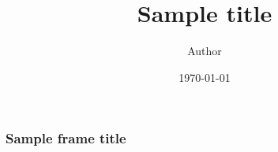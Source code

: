 \documentclass{beamer}
\title{Sample title}
\author{Author}
\date{\today}
\begin{document}
\frame{\titlepage}

\begin{frame}
\frametitle{Sample frame title}
\end{frame}
\end{document}
